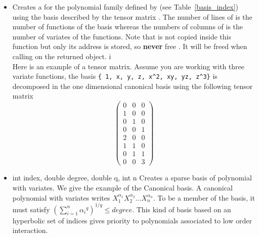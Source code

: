 \begin{itemize}
\item {}
  \sshortdescribe Creates a  for the polynomial family
  defined by  (see Table~\ref{basis_index}) using the basis
  described by the tensor matrix . The number of lines of  is
  the number of functions of the basis whereas the numbers of columns of
   is the number of variates of the functions.
  Note that  is not copied inside this function but only its address is
  stored, so {\bf never} free . It will be freed when calling
   on the returned object. i\\
  Here is an example of a tensor matrix. Assume you are working with three
  variate functions, the basis \verb!{ 1, x, y, z, x^2, xy, yz, z^3}! is
  decomposed in the one dimensional canonical basis using the following tensor
  matrix
  \[ \left(
    \begin{array}{ccc}
      0 & 0 & 0 \\
      1 & 0 & 0 \\
      0 & 1 & 0 \\
      0 & 0 & 1 \\
      2 & 0 & 0 \\
      1 & 1 & 0 \\
      0 & 1 & 1\\
      0 & 0 & 3
    \end{array}
  \right) \]

\item  {}
  {int index, double degree, double q, int n}
  \sshortdescribe Creates a sparse basis of polynomial with 
  variates. We give the example of the Canonical basis. A canonical polynomial
  with  variates writes $X_1^{\alpha_1} X_2^{\alpha_2} \dots
  X_n^{\alpha_n}$. To be a member of the basis, it must satisfy $\left(\sum_{i=1}^n
    {\alpha_i}^q \right)^{1/q} \leq degree$. This kind of basis based on an
  hyperbolic set of indices gives priority to polynomials associated to low
  order interaction.

\end{itemize}


